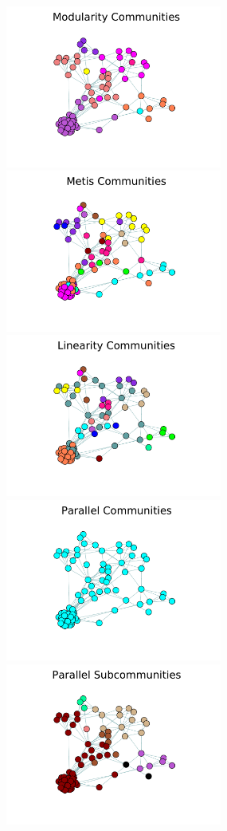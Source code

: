 \documentclass[phd,tocprelim]{cornell}
\begin{document}
\begin{figure}[!h]
\centering
\includegraphics[width=2.8in]{Figures/relativity_par_319_module}
\includegraphics[width=2.8in]{Figures/relativity_par_319_metis}
\includegraphics[width=2.8in]{Figures/relativity_par_319_linear}
\includegraphics[width=2.8in]{Figures/relativity_par_319_parallel}
\includegraphics[width=2.8in]{Figures/relativity_par_319_subparallel}

\end{figure}
\end{document}
